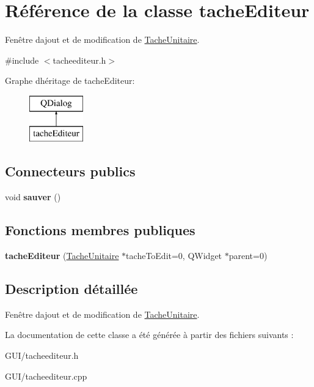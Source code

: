 \hypertarget{classtache_editeur}{}\section{Référence de la classe tache\+Editeur}
\label{classtache_editeur}


Fenêtre d\textquotesingle{}ajout et de modification de \hyperlink{class_tache_unitaire}{Tache\+Unitaire}.  




{\ttfamily \#include $<$tacheediteur.\+h$>$}

Graphe d\textquotesingle{}héritage de tache\+Editeur\+:\begin{figure}[H]
\begin{center}
\leavevmode
\includegraphics[height=2.000000cm]{classtache_editeur}
\end{center}
\end{figure}
\subsection*{Connecteurs publics}
\begin{DoxyCompactItemize}
\item 
\hypertarget{classtache_editeur_ab16a9e76ba7ef80478ff6eaf2e12c438}{}void {\bfseries sauver} ()\label{classtache_editeur_ab16a9e76ba7ef80478ff6eaf2e12c438}

\end{DoxyCompactItemize}
\subsection*{Fonctions membres publiques}
\begin{DoxyCompactItemize}
\item 
\hypertarget{classtache_editeur_ab1a1804a424319598c250665c34b4655}{}{\bfseries tache\+Editeur} (\hyperlink{class_tache_unitaire}{Tache\+Unitaire} $\ast$tache\+To\+Edit=0, Q\+Widget $\ast$parent=0)\label{classtache_editeur_ab1a1804a424319598c250665c34b4655}

\end{DoxyCompactItemize}


\subsection{Description détaillée}
Fenêtre d\textquotesingle{}ajout et de modification de \hyperlink{class_tache_unitaire}{Tache\+Unitaire}. 

La documentation de cette classe a été générée à partir des fichiers suivants \+:\begin{DoxyCompactItemize}
\item 
G\+U\+I/tacheediteur.\+h\item 
G\+U\+I/tacheediteur.\+cpp\end{DoxyCompactItemize}
